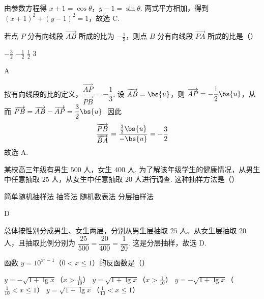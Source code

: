 \begin{solution}
由参数方程得 \(x+1=\cos\theta\)，\(y-1=\sin\theta\). 两式平方相加，得到 \((x+1)^{2}+(y-1)^{2}=1\)，故选 C.
\end{solution}

\begin{problem}
若点 \(P\) 分有向线段 \(\overrightarrow{AB}\) 所成的比为 \(-\frac{1}{3}\)，则点 \(B\) 分有向线段 \(\overrightarrow{PA}\) 所成的比是（\quad）

\choices
    {\(-\frac{3}{2}\)}
    {\(-\frac{1}{2}\)}
    {\(\frac{1}{2}\)}
    {\(3\)}
\end{problem}

\begin{answer}
A
\end{answer}

\begin{solution}
按有向线段的比的定义，\(\dfrac{\overrightarrow{AP}}{\overrightarrow{PB}}=-\dfrac{1}{3}\). 设 \(\overrightarrow{AB}=\bs{u}\)，则 \(\overrightarrow{AP}=-\dfrac{1}{2}\bs{u}\)，从而 \(\overrightarrow{PB}=\overrightarrow{AB}-\overrightarrow{AP}=\dfrac{3}{2}\bs{u}\). 因此
\[
\frac{\overrightarrow{PB}}{\overrightarrow{BA}}=\frac{\frac{3}{2}\bs{u}}{-\bs{u}}=-\frac{3}{2}
\]
故选 A.
\end{solution}

\begin{problem}
某校高三年级有男生 \(500\) 人，女生 \(400\) 人. 为了解该年级学生的健康情况，从男生中任意抽取 \(25\) 人，从女生中任意抽取 \(20\) 人进行调查. 这种抽样方法是（\quad）

\choices
    {简单随机抽样法}
    {抽签法}
    {随机数表法}
    {分层抽样法}
\end{problem}

\begin{answer}
D
\end{answer}

\begin{solution}
总体按性别分成男生、女生两层，分别从男生层抽取 \(25\) 人、从女生层抽取 \(20\) 人，且抽取比例分别为 \(\dfrac{25}{500}=\dfrac{20}{400}=\dfrac{1}{20}\). 这是分层抽样，故选 D.
\end{solution}

\begin{problem}
函数 \( y = 10^{x^{2} - 1} \)（\(0 < x \leqslant 1\)）的反函数是（\quad）

\choices
    {\(y = -\sqrt{1 + \lg x}\)（\(x > \frac{1}{10}\)）}
    {\(y = \sqrt{1 + \lg x}\)（\(x > \frac{1}{10}\)）}
    {\(y = -\sqrt{1 + \lg x}\)（\(\frac{1}{10} < x \leqslant 1\)）}
    {\(y = \sqrt{1 + \lg x}\)（\(\frac{1}{10} < x \leqslant 1\)）}
\end{problem}

